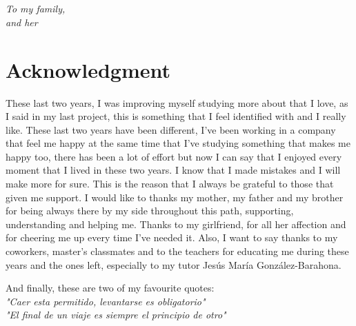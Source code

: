 \documentclass[a4paper, 12pt]{book}
\begin{document}
\newpage
\mbox{}
\thispagestyle{empty} %



\chapter*{}
\begin{flushright}
\textit{To my family, \\
and her
}
\end{flushright}


\chapter*{Acknowledgment}

These last two years, I was improving myself studying more about that I love, as I said in my last project, this is something that I feel identified with and I really like. These last two years have been different, I've been working in a company that feel me happy at the same time that I've studying something that makes me happy too, there has been a lot of effort but now I can say that I enjoyed every moment that I lived in these two years. I know that I made mistakes and I will make more for sure. This is the reason that I always be grateful to those that given me support. I would like to thanks my mother, my father and my brother for being always there by my side throughout this path, supporting, understanding and helping me. Thanks to my girlfriend, for all her affection and for cheering me up every time I've needed it. Also, I want to say thanks to my coworkers, master's classmates and to the teachers for educating me during these years and the ones left, especially to my tutor Jesús María González-Barahona.

And finally, these are two of my favourite quotes:\\ 

\textit{"Caer esta permitido, levantarse es obligatorio"}\\
\textit{"El final de un viaje es siempre el principio de otro"}
\end{document}
